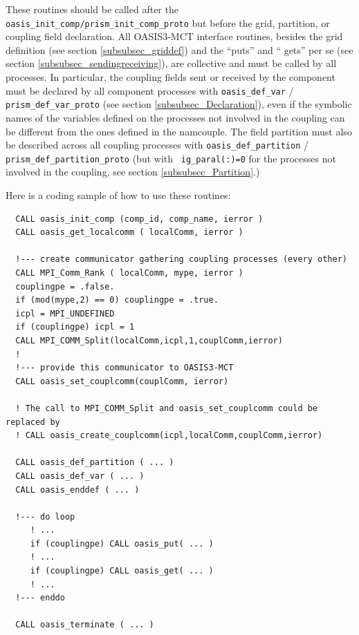 These routines should be called after the {\tt oasis\_init\_comp/prism\_init\_comp\_proto}
but before the grid, partition, or coupling field declaration.
All OASIS3-MCT interface routines, besides the grid definition (see
section \ref{subsubsec_griddef}) and the ``puts'' and `` gets'' per se
(see section \ref{subsubsec_sendingreceiving}), are collective and
must be called by all processes.
In particular, the
coupling fields sent or received by the component must be declared by
all component processes
with {\tt oasis\_def\_var} / {\tt prism\_def\_var\_proto} (see section \ref{subsubsec_Declaration}), even
if the symbolic names of the variables defined on the processes not involved in the coupling can be
different from the ones defined in the namcouple.
The field partition must also be described across all coupling
processes with {\tt oasis\_def\_partition} / {\tt prism\_def\_partition\_proto} (but with {\tt
  ig\_paral(:)=0} for the processes not involved in the coupling, see
section \ref{subsubsec_Partition}.) 

Here is a coding sample of how to use these routines:
 
\begin{verbatim}
  CALL oasis_init_comp (comp_id, comp_name, ierror )
  CALL oasis_get_localcomm ( localComm, ierror )

  !--- create communicator gathering coupling processes (every other)
  CALL MPI_Comm_Rank ( localComm, mype, ierror )
  couplingpe = .false.
  if (mod(mype,2) == 0) couplingpe = .true. 
  icpl = MPI_UNDEFINED
  if (couplingpe) icpl = 1
  CALL MPI_COMM_Split(localComm,icpl,1,couplComm,ierror)
  !
  !--- provide this communicator to OASIS3-MCT
  CALL oasis_set_couplcomm(couplComm, ierror)
  
  ! The call to MPI_COMM_Split and oasis_set_couplcomm could be replaced by 
  ! CALL oasis_create_couplcomm(icpl,localComm,couplComm,ierror)

  CALL oasis_def_partition ( ... )
  CALL oasis_def_var ( ... )
  CALL oasis_enddef ( ... )

  !--- do loop
     ! ...
     if (couplingpe) CALL oasis_put( ... )
     ! ...
     if (couplingpe) CALL oasis_get( ... )
     ! ...
  !--- enddo

  CALL oasis_terminate ( ... )
\end{verbatim}

